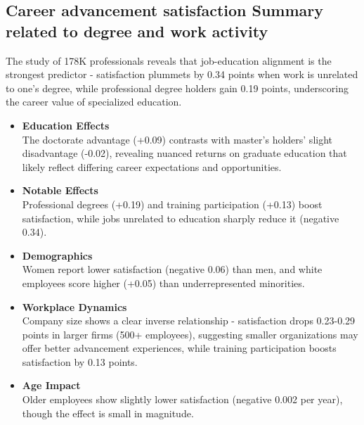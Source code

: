 \documentclass[12pt]{article}
\begin{document}
\subsection{Career advancement satisfaction Summary related to degree and work activity}
    The study of 178K professionals reveals that job-education alignment is the strongest predictor - satisfaction plummets by 0.34 points when work is unrelated to one's degree, while professional degree holders gain 0.19 points, underscoring the career value of specialized education.
\begin{itemize}
    \item \textbf{Education Effects}\\
    The doctorate advantage (+0.09) contrasts with master's holders' slight disadvantage (-0.02), revealing nuanced returns on graduate education that likely reflect differing career expectations and opportunities.
    \item \textbf{Notable Effects}\\
    Professional degrees (+0.19) and training participation (+0.13) boost satisfaction, while jobs unrelated to education sharply reduce it (negative 0.34).
    \item \textbf{Demographics}\\
    Women report lower satisfaction (negative 0.06) than men, and white employees score higher (+0.05) than underrepresented minorities.
    \item \textbf{Workplace Dynamics}\\
   Company size shows a clear inverse relationship - satisfaction drops 0.23-0.29 points in larger firms (500+ employees), suggesting smaller organizations may offer better advancement experiences, while training participation boosts satisfaction by 0.13 points.
    \item \textbf{Age Impact}\\
    Older employees show slightly lower satisfaction (negative 0.002 per year), though the effect is small in magnitude.
\end{itemize}
\end{document}
